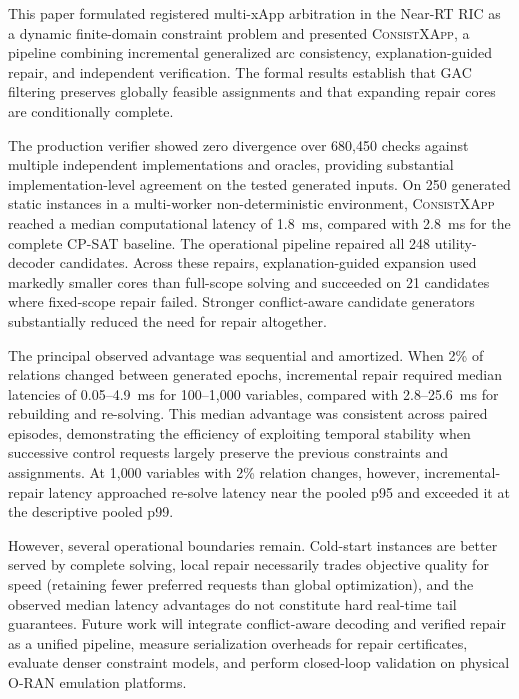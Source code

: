 \documentclass[pdflatex,sn-mathphys-num,iicol,oneside]{sn-jnl}
\newcommand{\method}{\textsc{ConsistXApp}\xspace}
\newcommand{\gac}{\textsc{GAC}\xspace}
\newcommand{\cpsat}{\textsc{CP-SAT}\xspace}
\begin{document}
This paper formulated registered multi-xApp arbitration in the Near-RT RIC as a dynamic finite-domain constraint problem and presented \method, a pipeline combining incremental generalized arc consistency, explanation-guided repair, and independent verification. The formal results establish that \gac filtering preserves globally feasible assignments and that expanding repair cores are conditionally complete.

The production verifier showed zero divergence over 680{,}450 checks against multiple independent implementations and oracles, providing substantial implementation-level agreement on the tested generated inputs. On 250 generated static instances in a multi-worker non-deterministic environment, \method reached a median computational latency of 1.8~ms,
compared with 2.8~ms for the complete \cpsat baseline. The operational pipeline repaired all 248 utility-decoder candidates. Across these repairs, explanation-guided expansion used markedly smaller cores than full-scope solving and succeeded on 21 candidates where fixed-scope repair failed. Stronger conflict-aware candidate generators substantially reduced the need for repair altogether.

The principal observed advantage was sequential and amortized. When 2\% of relations changed between generated epochs, incremental repair required median latencies of 0.05--4.9~ms for 100--1{,}000 variables, compared with 2.8--25.6~ms for rebuilding and re-solving. This median advantage was consistent across paired episodes, demonstrating the efficiency of exploiting temporal stability when successive control requests largely preserve the previous constraints and assignments. At 1{,}000 variables with 2\% relation changes, however, incremental-repair latency approached re-solve latency near the pooled p95 and exceeded it at the descriptive pooled p99.

However, several operational boundaries remain. Cold-start instances are better served by complete solving, local repair necessarily trades objective quality for speed (retaining fewer preferred requests than global optimization), and the observed median latency advantages do not constitute hard real-time tail guarantees. Future work will integrate conflict-aware decoding and verified repair as a unified pipeline, measure serialization overheads for repair certificates, evaluate denser constraint models, and perform closed-loop validation on physical O-RAN emulation platforms.

\end{document}
